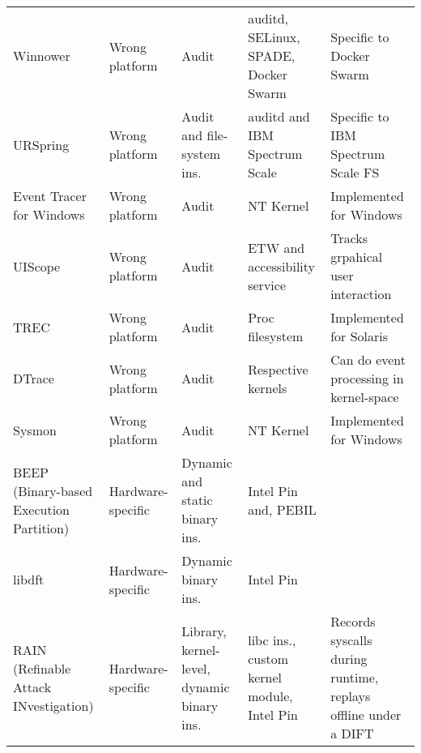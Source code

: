 \begin{table}
{\begin{tabular}{p{}p{}p{}p{}p{}}
Winnower \cite{hassan_towards_2018}                           & Wrong platform    & Audit                                           & auditd, SELinux, SPADE, Docker Swarm          & Specific to Docker Swarm                                      \\
URSpring                                                      & Wrong platform    & Audit and file-system ins.                      & auditd and IBM Spectrum Scale                 & Specific to IBM Spectrum Scale FS                             \\
Event Tracer for Windows \cite{noauthor_event_2021}           & Wrong platform    & Audit                                           & NT Kernel                                     & Implemented for Windows                                       \\
UIScope \cite{yang_uiscope_2020}                              & Wrong platform    & Audit                                           & ETW and accessibility service                 & Tracks grpahical user interaction                             \\
TREC \cite{vahdat_transparent_1998}                           & Wrong platform    & Audit                                           & Proc filesystem                               & Implemented for Solaris                                       \\
DTrace \cite{noauthor_about_nodate}                           & Wrong platform    & Audit                                           & Respective kernels                            & Can do event processing in kernel-space                       \\
Sysmon \cite{markruss_sysmon_2023}                            & Wrong platform    & Audit                                           & NT Kernel                                     & Implemented for Windows                                       \\
BEEP (Binary-based Execution Partition) \cite{lee_high_2017}  & Hardware-specific & Dynamic and static binary ins.                  & Intel Pin and, PEBIL                          &                                                               \\
libdft \cite{kemerlis_libdft_2012}                            & Hardware-specific & Dynamic binary ins.                             & Intel Pin                                     &                                                               \\
RAIN (Refinable Attack INvestigation) \cite{ji_rain_2017}     & Hardware-specific & Library, kernel-level, dynamic binary ins.      & libc ins., custom kernel module, Intel Pin    & Records syscalls during runtime, replays offline under a DIFT \\

\end{tabular}}
\end{table}
